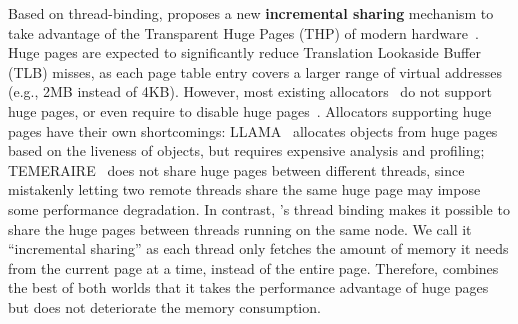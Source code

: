 Based on thread-binding, \NM{} proposes a new \textbf{incremental sharing} mechanism to take advantage of the Transparent Huge Pages (THP) of modern hardware~\cite{hugepage}. Huge pages are expected to significantly reduce Translation Lookaside Buffer (TLB) misses, as each page table entry covers a larger range of virtual addresses (e.g., 2MB instead of 4KB). However, most existing allocators~\cite{dlmalloc, Hoard, Scalloc} do not support huge pages, or even require to disable huge pages~\cite{scallochugepage}.  Allocators supporting huge pages have their own shortcomings: LLAMA~\cite{LLAMA} allocates objects from huge pages based on the liveness of objects, but requires expensive analysis and profiling; TEMERAIRE~\cite{TEMERAIRE} does not share huge pages between different threads, since mistakenly letting two remote threads share the same huge page may impose some performance degradation.  
In contrast, \NM{}'s thread binding makes it possible to share the huge pages between threads running on the same node. We call it ``incremental sharing'' as each thread only fetches the amount of memory it needs from the current page at a time, instead of the entire page.
Therefore, \NM{} combines the best of both worlds that it takes the performance advantage of huge pages but does not deteriorate the memory consumption. 


